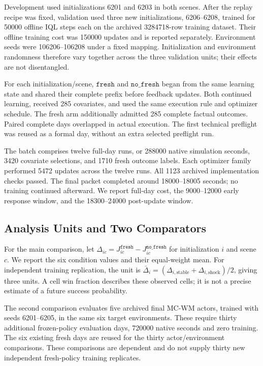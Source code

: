 \documentclass[journal]{IEEEtran}
\newcommand{\nf}{\texttt{no\_fresh}}
\newcommand{\fresh}{\texttt{fresh}}
\begin{document}
Development used initializations 6201 and 6203 in both scenes. After the replay recipe was fixed, validation used three new initializations, 6206--6208, trained for 50000 offline IQL steps each on the archived 3284718-row training dataset. Their offline training cost was 150000 updates and is reported separately. Environment seeds were 106206--106208 under a fixed mapping. Initialization and environment randomness therefore vary together across the three validation units; their effects are not disentangled.

For each initialization/scene, $\fresh$ and $\nf$ began from the same learning state and shared their complete prefix before feedback updates. Both continued learning, received 285 covariates, and used the same execution rule and optimizer schedule. The fresh arm additionally admitted 285 complete factual outcomes. Paired complete days overlapped in actual execution. The first technical preflight was reused as a formal day, without an extra selected preflight run.

The batch comprises twelve full-day runs, or 288000 native simulation seconds, 3420 covariate selections, and 1710 fresh outcome labels. Each optimizer family performed 5472 updates across the twelve runs. All 1123 archived implementation checks passed. The final packet completed around 18000--18005 seconds; no training continued afterward. We report full-day cost, the 9000--12000 early response window, and the 18300--24000 post-update window.

\subsection{Analysis Units and Two Comparators}
For the main comparison, let $\Delta_{ic}=J^{\fresh}_{ic}-J^{\nf}_{ic}$ for initialization $i$ and scene $c$. We report the six condition values and their equal-weight mean. For independent training replication, the unit is $\bar\Delta_i=(\Delta_{i,\mathrm{stable}}+\Delta_{i,\mathrm{shock}})/2$, giving three units. A cell win fraction describes these observed cells; it is not a precise estimate of a future success probability.

The second comparison evaluates five archived final MC-WM actors, trained with seeds 6201--6205, in the same six target environments. These require thirty additional frozen-policy evaluation days, 720000 native seconds and zero training. The six existing fresh days are reused for the thirty actor/environment comparisons. These comparisons are dependent and do not supply thirty new independent fresh-policy training replicates.
\end{document}
